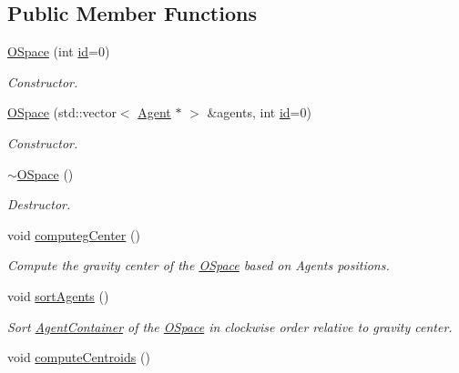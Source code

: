 \subsection*{Public Member Functions}
\begin{DoxyCompactItemize}
\item 
\hyperlink{classOSpace_ae160e76b0b2d3c1367946f8bb965bd1e}{O\+Space} (int \hyperlink{classIdentifiedObject_ad044a317a9b573a3d1bcd025df166eb5}{id}=0)
\begin{DoxyCompactList}\small\item\em Constructor. \end{DoxyCompactList}\item 
\hyperlink{classOSpace_acd0c5685bc984af6287108710a1333ff}{O\+Space} (std\+::vector$<$ \hyperlink{classAgent}{Agent} $\ast$ $>$ \&agents, int \hyperlink{classIdentifiedObject_ad044a317a9b573a3d1bcd025df166eb5}{id}=0)
\begin{DoxyCompactList}\small\item\em Constructor. \end{DoxyCompactList}\item 
\hyperlink{classOSpace_af8078a93268b4064919701765ad59451}{$\sim$\+O\+Space} ()
\begin{DoxyCompactList}\small\item\em Destructor. \end{DoxyCompactList}\item 
void \hyperlink{classOSpace_a3d2cba9a025785ee12c0991085b08b21}{computeg\+Center} ()\hypertarget{classOSpace_a3d2cba9a025785ee12c0991085b08b21}{}\label{classOSpace_a3d2cba9a025785ee12c0991085b08b21}

\begin{DoxyCompactList}\small\item\em Compute the gravity center of the \hyperlink{classOSpace}{O\+Space} based on Agents positions. \end{DoxyCompactList}\item 
void \hyperlink{classOSpace_ad79a227974adf66884379213fbf54068}{sort\+Agents} ()\hypertarget{classOSpace_ad79a227974adf66884379213fbf54068}{}\label{classOSpace_ad79a227974adf66884379213fbf54068}

\begin{DoxyCompactList}\small\item\em Sort \hyperlink{classAgentContainer}{Agent\+Container} of the \hyperlink{classOSpace}{O\+Space} in clockwise order relative to gravity center. \end{DoxyCompactList}\item 
void \hyperlink{classOSpace_ad6163ea6ef19516251e397caf59fdf4d}{compute\+Centroids} ()\hypertarget{classOSpace_ad6163ea6ef19516251e397caf59fdf4d}{}\label{classOSpace_ad6163ea6ef19516251e397caf59fdf4d}


\end{DoxyCompactItemize}
